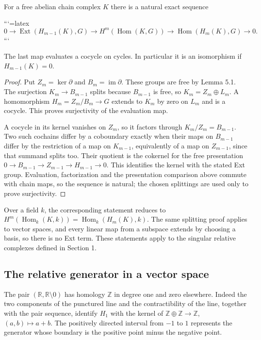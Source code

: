 \begin{theorem}
For a free abelian chain complex \(K\) there is a natural exact sequence



```{=latex}
\[
0\to\operatorname{Ext}(H_{m-1}(K),G)
\to H^m(\operatorname{Hom}(K,G))
\to\operatorname{Hom}(H_m(K),G)\to0.
\]
```



The last map evaluates a cocycle on cycles. In particular it is an isomorphism if \(H_{m-1}(K)=0\).
\end{theorem}
\begin{proof}
Put \(Z_m=\ker\partial\) and \(B_m=\operatorname{im}\partial\). These groups are free by Lemma 5.1. The surjection \(K_m\to B_{m-1}\) splits because \(B_{m-1}\) is free, so \(K_m=Z_m\oplus L_m\). A homomorphism \(H_m=Z_m/B_m\to G\) extends to \(K_m\) by zero on \(L_m\) and is a cocycle. This proves surjectivity of the evaluation map.

A cocycle in its kernel vanishes on \(Z_m\), so it factors through \(K_m/Z_m=B_{m-1}\). Two such cochains differ by a coboundary exactly when their maps on \(B_{m-1}\) differ by the restriction of a map on \(K_{m-1}\), equivalently of a map on \(Z_{m-1}\), since that summand splits too. Their quotient is the cokernel for the free presentation
\(0\to B_{m-1}\to Z_{m-1}\to H_{m-1}\to0\).
This identifies the kernel with the stated Ext group. Evaluation, factorization and the presentation comparison above commute with chain maps, so the sequence is natural; the chosen splittings are used only to prove surjectivity.
\end{proof}

Over a field \(k\), the corresponding statement reduces to
\(H^m(\operatorname{Hom}_k(K,k))=\operatorname{Hom}_k(H_m(K),k)\).
The same splitting proof applies to vector spaces, and every linear map from a subspace extends by choosing a basis, so there is no Ext term. These statements apply to the singular relative complexes defined in Section 1.

\subsection{The relative generator in a vector space}
\label{courseIII:thom-euler-for-lesson11:section-6}

The pair \((\mathbb R,\mathbb R\setminus0)\) has homology \(\mathbb Z\) in degree one and zero elsewhere. Indeed the two components of the punctured line and the contractibility of the line, together with the pair sequence, identify \(H_1\) with the kernel of
\(\mathbb Z\oplus\mathbb Z\to\mathbb Z\), \((a,b)\mapsto a+b\).
The positively directed interval from \(-1\) to \(1\) represents the generator whose boundary is the positive point minus the negative point.

